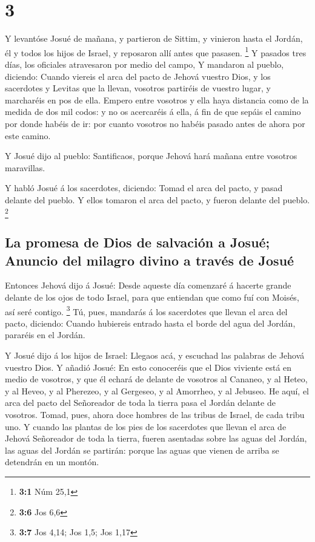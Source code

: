 \hypertarget{section-2}{%
\section{3}\label{section-2}}

 Y levantóse Josué de mañana, y partieron de Sittim, y
vinieron hasta el Jordán, él y todos los hijos de Israel, y reposaron
allí antes que pasasen. \footnote{\textbf{3:1} Núm 25,1}  Y
pasados tres días, los oficiales atravesaron por medio del campo,
 Y mandaron al pueblo, diciendo: Cuando viereis el arca del
pacto de Jehová vuestro Dios, y los sacerdotes y Levitas que la llevan,
vosotros partiréis de vuestro lugar, y marcharéis en pos de ella.
 Empero entre vosotros y ella haya distancia como de la
medida de dos mil codos: y no os acercaréis á ella, á fin de que sepáis
el camino por donde habéis de ir: por cuanto vosotros no habéis pasado
antes de ahora por este camino.

 Y Josué dijo al pueblo: Santificaos, porque Jehová hará
mañana entre vosotros maravillas.

 Y habló Josué á los sacerdotes, diciendo: Tomad el arca del
pacto, y pasad delante del pueblo. Y ellos tomaron el arca del pacto, y
fueron delante del pueblo. \footnote{\textbf{3:6} Jos 6,6}

\hypertarget{la-promesa-de-dios-de-salvaciuxf3n-a-josuuxe9-anuncio-del-milagro-divino-a-travuxe9s-de-josuuxe9}{%
\subsection{La promesa de Dios de salvación a Josué; Anuncio del milagro
divino a través de
Josué}\label{la-promesa-de-dios-de-salvaciuxf3n-a-josuuxe9-anuncio-del-milagro-divino-a-travuxe9s-de-josuuxe9}}

 Entonces Jehová dijo á Josué: Desde aqueste día comenzaré á
hacerte grande delante de los ojos de todo Israel, para que entiendan
que como fuí con Moisés, así seré contigo. \footnote{\textbf{3:7} Jos
  4,14; Jos 1,5; Jos 1,17}  Tú, pues, mandarás á los
sacerdotes que llevan el arca del pacto, diciendo: Cuando hubiereis
entrado hasta el borde del agua del Jordán, pararéis en el Jordán.

 Y Josué dijo á los hijos de Israel: Llegaos acá, y escuchad
las palabras de Jehová vuestro Dios.  Y añadió Josué: En
esto conoceréis que el Dios viviente está en medio de vosotros, y que él
echará de delante de vosotros al Cananeo, y al Heteo, y al Heveo, y al
Pherezeo, y al Gergeseo, y al Amorrheo, y al Jebuseo.  He
aquí, el arca del pacto del Señoreador de toda la tierra pasa el Jordán
delante de vosotros.  Tomad, pues, ahora doce hombres de
las tribus de Israel, de cada tribu uno.  Y cuando las
plantas de los pies de los sacerdotes que llevan el arca de Jehová
Señoreador de toda la tierra, fueren asentadas sobre las aguas del
Jordán, las aguas del Jordán se partirán: porque las aguas que vienen de
arriba se detendrán en un montón.

